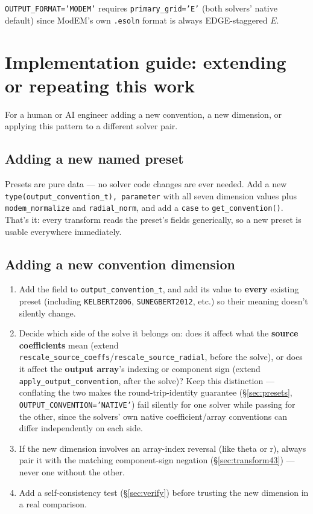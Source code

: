 \documentclass[11pt]{article}
\begin{document}
\texttt{OUTPUT\_FORMAT='MODEM'} requires \texttt{primary\_grid='E'} (both solvers' native default)
since ModEM's own \texttt{.esoln} format is always EDGE-staggered $E$.

\section{Implementation guide: extending or repeating this work}

For a human or AI engineer adding a new convention, a new dimension, or applying this pattern to a
different solver pair.

\subsection{Adding a new named preset}

Presets are pure data --- no solver code changes are ever needed. Add a new
\texttt{type(output\_convention\_t), parameter} with all seven dimension values plus
\texttt{modem\_normalize} and \texttt{radial\_norm}, and add a \texttt{case} to
\texttt{get\_convention()}. That's it: every transform reads the preset's fields generically, so a
new preset is usable everywhere immediately.

\subsection{Adding a new convention dimension}

\begin{enumerate}
\item Add the field to \texttt{output\_convention\_t}, and add its value to \textbf{every}
existing preset (including \texttt{KELBERT2006}, \texttt{SUNEGBERT2012}, etc.) so their meaning
doesn't silently change.
\item Decide which side of the solve it belongs on: does it affect what the \textbf{source
coefficients} mean (extend \texttt{rescale\_source\_coeffs}/\texttt{rescale\_source\_radial},
before the solve), or does it affect the \textbf{output array}'s indexing or component sign
(extend \texttt{apply\_output\_convention}, after the solve)? Keep this distinction ---
conflating the two makes the round-trip-identity guarantee (\S\ref{sec:presets},
\texttt{OUTPUT\_CONVENTION='NATIVE'}) fail silently for one solver while passing for the other,
since the solvers' own native coefficient/array conventions can differ independently on each
side.
\item If the new dimension involves an array-index reversal (like theta or r), always pair it
with the matching component-sign negation (\S\ref{sec:transform43}) --- never one without the
other.
\item Add a self-consistency test (\S\ref{sec:verify}) before trusting the new dimension in a
real comparison.
\end{enumerate}
\end{document}
